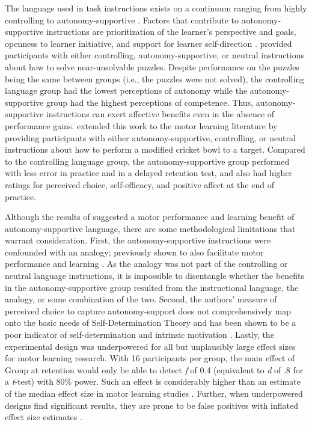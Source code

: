 \documentclass[doc,floatsintext,donotrepeattitle,letterpaper,12pt]{apa7}
\begin{document}
The language used in task instructions exists on a continuum ranging from highly controlling to autonomy-supportive \autocite{reeve2009}. Factors that contribute to autonomy-supportive instructions are prioritization of the learner's perspective and goals, openness to learner initiative, and support for learner self-direction \autocite{reeve2009,reeve2011}. \textcite{reeve2011} provided participants with either controlling, autonomy-supportive, or neutral instructions about how to solve near-unsolvable puzzles. Despite performance on the puzzles being the same between groups (i.e., the puzzles were not solved), the controlling language group had the lowest perceptions of autonomy while the autonomy-supportive group had the highest perceptions of competence. Thus, autonomy-supportive instructions can exert affective benefits even in the absence of performance gains. \textcite{hooyman2014} extended this work to the motor learning literature by providing participants with either autonomy-supportive, controlling, or neutral instructions about how to perform a modified cricket bowl to a target. Compared to the controlling language group, the autonomy-supportive group performed with less error in practice and in a delayed retention test, and also had higher ratings for perceived choice, self-efficacy, and positive affect at the end of practice.

Although the results of \textcite{hooyman2014} suggested a motor performance and learning benefit of autonomy-supportive language, there are some methodological limitations that warrant consideration. First, the autonomy-supportive instructions were confounded with an analogy; previously shown to also facilitate motor performance and learning \autocites[e.g., ][]{liao2001}[see][for a review]{masters2020}. As the analogy was not part of the controlling or neutral language instructions, it is impossible to disentangle whether the benefits in the autonomy-supportive group resulted from the instructional language, the analogy, or some combination of the two. Second, the authors' measure of perceived choice to capture autonomy-support does not comprehensively map onto the basic needs of Self-Determination Theory \autocite{mcdonough2007,ng2011,ryan2020} and has been shown to be a poor indicator of self-determination and intrinsic motivation \autocite{reeve2003}. Lastly, the experimental design was underpowered for all but unplausibly large effect sizes for motor learning research. With 16 participants per group, the main effect of Group at retention would only be able to detect \emph{f} of 0.4 (equivalent to \emph{d} of .8 for a \emph{t}-test) with 80\% power. Such an effect is considerably higher than an estimate of the median effect size in motor learning studies \autocite[$d = 0.63$,][]{lohse2016}. Further, when underpowered designs find significant results, they are prone to be false positives with inflated effect size estimates \autocite{button2013,simmons2011}.
\end{document}
